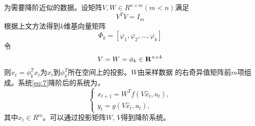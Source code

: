 为需要降阶近似的数据。设矩阵$V,W \in {R^{n \times m}}$$(m<n)$满足
\begin{equation}
\label{eq:9}
{V^T}V = {I_m}  
\end{equation}
根据上文方法得到$k$维基向量矩阵
\begin{equation}
\label{eq:10}
{\varPhi  _k} = [{\varphi _1},{\varphi _2},...,{\varphi _k}]
\end{equation}
令
\begin{equation}
\label{eq:11}
V = W = {\phi _k} \in {{\bf{R}}^{n \times k}}
\end{equation}
则${\hat x_t} = \phi _k^T{x_t}$为${x_t}$到$\phi _k^T$所在空间上的投影。$W$由采样数据 的右奇异值矩阵前$m$项组成。系统\ref{eq:7}降阶后的系统为，
\begin{equation}
\label{eq:12} 
\left\{ \begin{array}{l}
  {x_{t + 1}} = {W^T}f(V{{\hat x}_t},{u_t}),\\
  {y_t} = g(V{{\hat x}_t},{u_t}),
  \end{array} \right.
\end{equation}
其中${\hat x_t} \in {R^m}$。可以通过投影矩阵$W$, $V$得到降阶系统。

